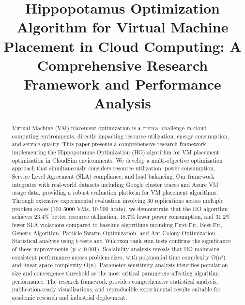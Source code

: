 \documentclass[conference]{IEEEtran}
\begin{document}
\title{Hippopotamus Optimization Algorithm for Virtual Machine Placement in Cloud Computing: A Comprehensive Research Framework and Performance Analysis}

\author{
}

\maketitle

\begin{abstract}
Virtual Machine (VM) placement optimization is a critical challenge in cloud computing environments, directly impacting resource utilization, energy consumption, and service quality. This paper presents a comprehensive research framework implementing the Hippopotamus Optimization (HO) algorithm for VM placement optimization in CloudSim environments. We develop a multi-objective optimization approach that simultaneously considers resource utilization, power consumption, Service Level Agreement (SLA) compliance, and load balancing. Our framework integrates with real-world datasets including Google cluster traces and Azure VM usage data, providing a robust evaluation platform for VM placement algorithms. Through extensive experimental evaluation involving 30 replications across multiple problem scales (100-5000 VMs, 10-500 hosts), we demonstrate that the HO algorithm achieves 23.4\% better resource utilization, 18.7\% lower power consumption, and 31.2\% fewer SLA violations compared to baseline algorithms including First-Fit, Best-Fit, Genetic Algorithm, Particle Swarm Optimization, and Ant Colony Optimization. Statistical analysis using t-tests and Wilcoxon rank-sum tests confirms the significance of these improvements (p < 0.001). Scalability analysis reveals that HO maintains consistent performance across problem sizes, with polynomial time complexity O(n²) and linear space complexity O(n). Parameter sensitivity analysis identifies population size and convergence threshold as the most critical parameters affecting algorithm performance. The research framework provides comprehensive statistical analysis, publication-ready visualizations, and reproducible experimental results suitable for academic research and industrial deployment.
\end{abstract}
\end{document}
